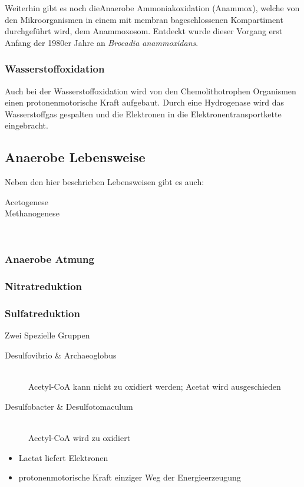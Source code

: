 Weiterhin gibt es noch dieAnaerobe Ammoniakoxidation (Anammox),
welche von den Mikroorganismen in einem mit membran bageschlossenen Kompartiment 
durchgeführt wird,
dem Anammoxosom.
Entdeckt wurde dieser Vorgang erst Anfang der 1980er Jahre an \emph{Brocadia anammoxidans}.
\\

\subsubsection{Wasserstoffoxidation}
Auch bei der Wasserstoffoxidation wird von den Chemolithotrophen Organismen
einen protonenmotorische Kraft aufgebaut.
Durch eine Hydrogenase wird das Wasserstoffgas gespalten
und die Elektronen in die Elektronentransportkette eingebracht.

\subsection{Anaerobe Lebensweise}
Neben den hier beschrieben Lebensweisen gibt es auch:
\begin{description}
	\item[Acetogenese]
	\item[Methanogenese]	\hfill \\
\end{description}

\subsubsection{Anaerobe Atmung}
\subsubsection{Nitratreduktion}
\subsubsection{Sulfatreduktion}
Zwei Spezielle Gruppen
\begin{description}
	\item[Desulfovibrio \& Archaeoglobus] \hfill \\
		Acetyl-CoA kann nicht zu  oxidiert werden; Acetat wird ausgeschieden
	\item[Desulfobacter \& Desulfotomaculum] \hfill \\
		Acetyl-CoA wird zu  oxidiert
\end{description}

\begin{itemize}
	\item Lactat liefert Elektronen
	\item protonenmotorische Kraft einziger Weg der Energieerzeugung
\end{itemize}

